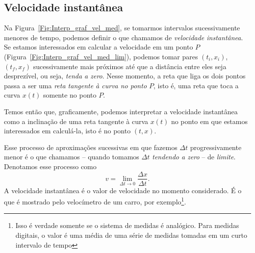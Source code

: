 \subsection{Velocidade instantânea}

Na Figura~\ref{Fig:Interp_graf_vel_med}, se tomarmos intervalos sucessivamente menores de tempo, podemos definir o que chamamos de \emph{velocidade instantânea}. Se estamos interessados em calcular a velocidade em um ponto $P$ (Figura~\ref{Fig:Interp_graf_vel_med_lim}), podemos tomar pares $(t_i, x_i)$, $(t_f, x_f)$ sucessivamente mais próximos até que a distância entre eles seja desprezível, ou seja, \emph{tenda a zero}. Nesse momento, a reta que liga os dois pontos passa a ser uma \emph{reta tangente à curva no ponto $P$}, isto é, uma reta que toca a curva $x(t)$ somente no ponto $P$.

Temos então que, graficamente, podemos interpretar a velocidade instantânea como a inclinação de uma reta tangente à curva $x(t)$ no ponto em que estamos interessados em calculá-la, isto é no ponto $(t,x)$.

Esse processo de aproximações sucessivas em que fazemos $\Delta t$ progressivamente menor é o que chamamos -- quando tomamos \emph{$\Delta t$ tendendo a zero} -- de \emph{limite}. Denotamos esse processo como
\begin{equation}
  v = \lim_{\Delta t \to 0} \frac{\Delta x}{\Delta t}.
\end{equation}
%
A velocidade instantânea é o valor de velocidade no momento considerado. É o que é mostrado pelo velocímetro de um carro, por exemplo\footnote[][-3cm]{Isso é verdade somente se o sistema de medidas é analógico. Para medidas digitais, o valor é uma média de uma série de medidas tomadas em um curto intervalo de tempo}.

